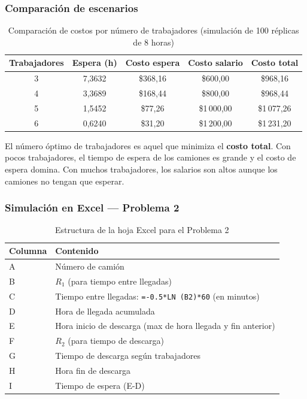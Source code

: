 \documentclass[12pt,a4paper]{article}
\begin{document}
\subsubsection{Comparación de escenarios}

\begin{table}[H]
\centering
\caption{Comparación de costos por número de trabajadores (simulación de 100 réplicas de 8 horas)}
\begin{tabular}{ccccc}
\toprule
\textbf{Trabajadores} & \textbf{Espera (h)} & \textbf{Costo espera} & \textbf{Costo salario} & \textbf{Costo total} \\
\midrule
3 & 7,3632 & \$368,16 & \$600,00 & \$968,16 \\
4 & 3,3689 & \$168,44 & \$800,00 & \$968,44 \\
5 & 1,5452 & \$77,26  & \$1\,000,00 & \$1\,077,26 \\
6 & 0,6240 & \$31,20  & \$1\,200,00 & \$1\,231,20 \\
\bottomrule
\end{tabular}
\end{table}

\begin{notabox}
El número óptimo de trabajadores es aquel que minimiza el \textbf{costo total}. Con pocos trabajadores, el tiempo de espera de los camiones es grande y el costo de espera domina. Con muchos trabajadores, los salarios son altos aunque los camiones no tengan que esperar.
\end{notabox}

\subsubsection{Simulación en Excel — Problema 2}

\begin{table}[H]
\centering
\caption{Estructura de la hoja Excel para el Problema 2}
\begin{tabular}{>{\ttfamily}l l}
\toprule
\textbf{Columna} & \textbf{Contenido} \\
\midrule
A & Número de camión \\
B & $R_1$ (para tiempo entre llegadas) \\
C & Tiempo entre llegadas: \texttt{=-0.5*LN (B2)*60} (en minutos) \\
D & Hora de llegada acumulada \\
E & Hora inicio de descarga (max de hora llegada y fin anterior) \\
F & $R_2$ (para tiempo de descarga) \\
G & Tiempo de descarga según trabajadores \\
H & Hora fin de descarga \\
I & Tiempo de espera (E-D) \\
\bottomrule
\end{tabular}
\end{table}
\end{document}
